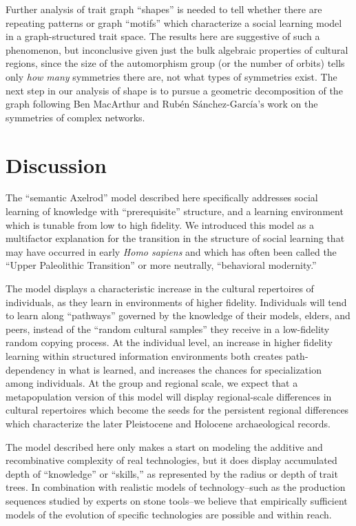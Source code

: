 \documentclass[referee,graybox,natbib]{svmult}
\begin{document}
Further analysis of trait graph ``shapes'' is needed to tell whether
there are repeating patterns or graph ``motifs'' which characterize a
social learning model in a graph-structured trait space. The results
here are suggestive of such a phenomenon, but inconclusive given just
the bulk algebraic properties of cultural regions, since the size of the
automorphism group (or the number of orbits) tells only \emph{how many}
symmetries there are, not what types of symmetries exist. The next step
in our analysis of shape is to pursue a geometric decomposition of the
graph following Ben MacArthur and
$\textrm{Rub\'en S\'anchez-Garc\'ia's}$
\citeyearpar{macarthur2008symmetry} work on the symmetries of complex
networks.

\section{Discussion}\label{discussion}

The ``semantic Axelrod'' model described here specifically addresses
social learning of knowledge with ``prerequisite'' structure, and a
learning environment which is tunable from low to high fidelity. We
introduced this model as a multifactor explanation for the transition in
the structure of social learning that may have occurred in early
\emph{Homo sapiens} and which has often been called the ``Upper
Paleolithic Transition'' or more neutrally, ``behavioral modernity.''

The model displays a characteristic increase in the cultural repertoires
of individuals, as they learn in environments of higher fidelity.
Individuals will tend to learn along ``pathways'' governed by the
knowledge of their models, elders, and peers, instead of the ``random
cultural samples'' they receive in a low-fidelity random copying
process. At the individual level, an increase in higher fidelity
learning within structured information environments both creates
path-dependency in what is learned, and increases the chances for
specialization among individuals. At the group and regional scale, we
expect that a metapopulation version of this model will display
regional-scale differences in cultural repertoires which become the
seeds for the persistent regional differences which characterize the
later Pleistocene and Holocene archaeological records.

The model described here only makes a start on modeling the additive and
recombinative complexity of real technologies, but it does display
accumulated depth of ``knowledge'' or ``skills,'' as represented by the
radius or depth of trait trees. In combination with realistic models of
technology--such as the production sequences studied by experts on stone
tools--we believe that empirically sufficient models of the evolution of
specific technologies are possible and within reach.
\end{document}
